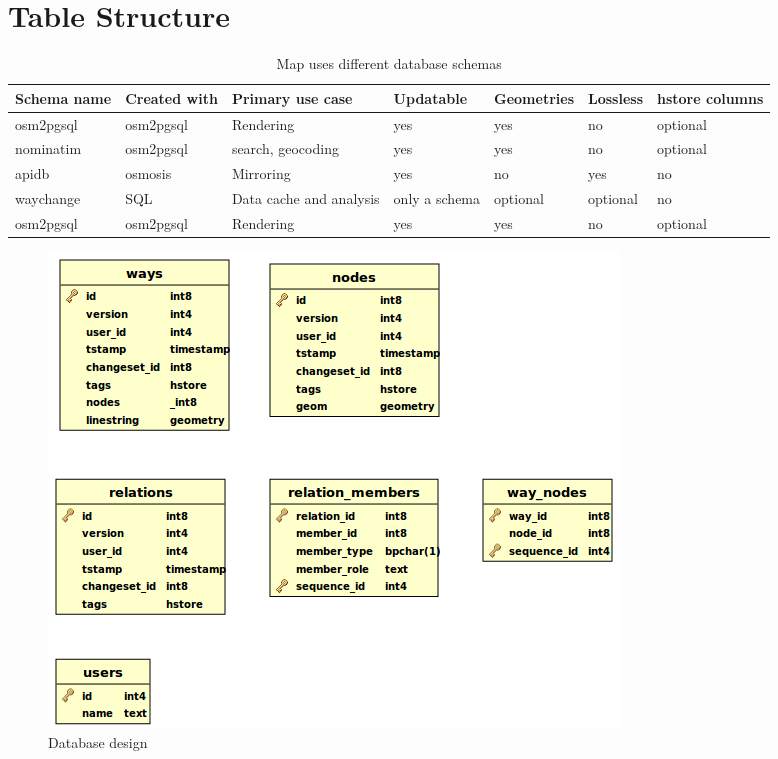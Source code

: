 \section{Table Structure}

\begin{table}[h!]
\caption{Map uses different database schemas}

\begin{tabular}{|p{2cm}|p{2cm}|p{2.5cm}|p{2cm}|p{2cm}|p{2cm}|p{2cm}|}
\hline
Schema name & Created with & Primary use case & Updatable
& Geometries & Lossless & hstore columns\\

\hline \rule[-2ex]{0pt}{5.5ex}
osm2pgsql & osm2pgsql & Rendering
& yes & yes & no & optional\\

\hline \rule[-2ex]{0pt}{5.5ex}  
nominatim & osm2pgsql & search, geocoding
& yes & yes & no & optional\\

\hline \rule[-2ex]{0pt}{5.5ex}  
apidb & osmosis & Mirroring
& yes & no & yes & no\\

\hline \rule[-2ex]{0pt}{5.5ex}  
waychange & SQL & Data cache and analysis
& only a schema & optional & optional & no\\

\hline \rule[-2ex]{0pt}{5.5ex}  
osm2pgsql & osm2pgsql & Rendering
& yes & yes & no & optional\\

\hline
\end{tabular}
\end{table}

\iffalse

\begin{figure}[h!]
	\centering
	\includegraphics[scale=0.8]{input/images/osm_db.png}
	\caption{Database design}
\end{figure}

